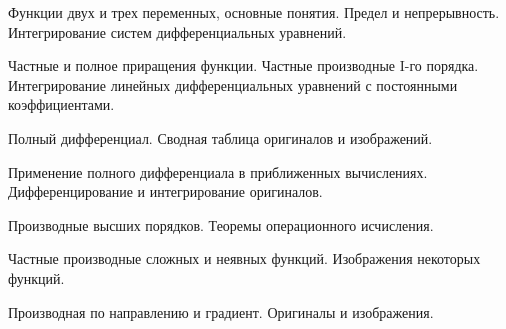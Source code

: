 \documentclass[
	14pt,
	a4paper,
	]
	{scrartcl}
\begin{document}
\shapk
{}
\setcounter{zad}{0}

\vfill
\z Функции двух и трех переменных, основные понятия. Предел и непрерывность.
 \vfill
\z Интегрирование систем дифференциальных уравнений. \vfill

\vfill

\newpage


\shapk
{}
\setcounter{zad}{0}

\vfill
\z Частные и полное приращения функции. Частные производные I-го порядка.
 \vfill
\z Интегрирование линейных дифференциальных уравнений с постоянными коэффициентами.
 \vfill

\vfill

\newpage


\shapk
{}
\setcounter{zad}{0}

\vfill
\z Полный дифференциал.
 \vfill
\z Сводная таблица оригиналов и изображений.
 \vfill

\vfill

\newpage


\shapk
{}
\setcounter{zad}{0}

\vfill
\z Применение полного дифференциала в приближенных вычислениях.
 \vfill
\z Дифференцирование и интегрирование оригиналов.
 \vfill

\vfill

\newpage


\shapk
{}
\setcounter{zad}{0}

\vfill
\z Производные высших порядков.
 \vfill
\z Теоремы операционного исчисления.
 \vfill

\vfill

\newpage


\shapk
{}
\setcounter{zad}{0}

\vfill
\z Частные производные сложных и неявных функций.
 \vfill
\z Изображения некоторых функций.
 \vfill

\vfill

\newpage


\shapk
{}
\setcounter{zad}{0}

\vfill
\z Производная по направлению и градиент.
 \vfill
\z Оригиналы и изображения.
 \vfill

\vfill

\newpage


\shapk
{}
\setcounter{zad}{0}
\end{document}
